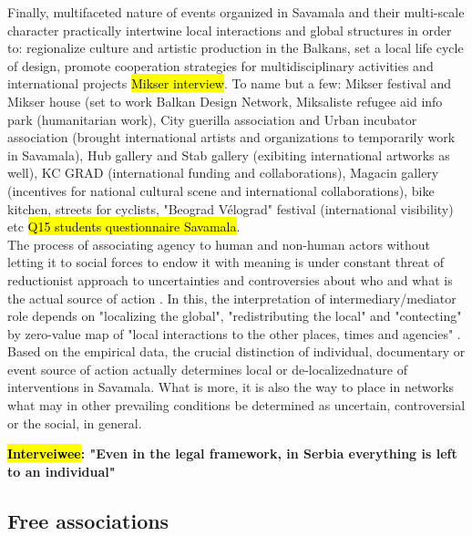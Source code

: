 \documentclass[11pt]{report}
\begin{document}
Finally, multifaceted nature of events organized in Savamala and their multi-scale character practically intertwine local interactions and global structures in order to:
regionalize culture and artistic production in the Balkans,
set a local life cycle of design,
promote cooperation strategies for multidisciplinary activities and international projects \hl{Mikser interview}.
To name but a few:
Mikser festival and Mikser house (set to work Balkan Design Network,
Miksaliste refugee aid info park (humanitarian work), 
City guerilla association and Urban incubator association (brought international artists and organizations to temporarily work in Savamala),
Hub gallery and Stab gallery (exibiting international artworks as well),
KC GRAD (international funding and collaborations),
Magacin gallery (incentives for national cultural scene and international collaborations),
bike kitchen, streets for cyclists, "Beograd Vélograd" festival (international visibility)
etc
\hl{Q15 students questionnaire Savamala}.
\\
The process of associating agency to human and non-human actors without letting it to social forces to endow it with meaning is under constant threat of reductionist approach to uncertainties and controversies about who and what is the actual source of action \cite{Latour 2005}. In this, the interpretation of intermediary/mediator role depends on "localizing the global", "redistributing the local" and "contecting" by zero-value map of "local interactions to the other places, times and agencies" \cite{Latour 2005}. Based on the empirical data, the crucial distinction of individual, documentary or event source of action actually determines local or de-localized\footnotemark nature of interventions in Savamala. What is more, it is also the way to place in networks what may in other prevailing conditions be determined as uncertain, controversial or the social, in general.

\textbf{\hl{Interveiwee}:
"Even in the legal framework, in Serbia everything is left to an individual"}

\subsection{Free associations}
\end{document}
